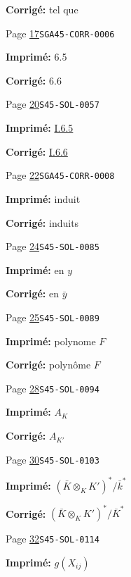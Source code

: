 \documentclass[oneside]{book}
\theoremstyle{sga-source}
\theoremstyle{sga-source-dash}
\theoremstyle{sga-source-dotdash}
\theoremstyle{sga-source-number-note-dash}
\theoremstyle{sga-source-note-number-dotdash}
\theoremstyle{sga-source-example-dotdash}
\theoremstyle{sga-source-inline-number}
\theoremstyle{sga-source-bare-number}
\theoremstyle{sga-source}
\begin{document}
\begin{description}
\par\noindent\textbf{Corrigé:} tel que
\smallskip
\item[\hypertarget{apparatus:FR-0009}{9}] Page \hyperlink{printpage:fr:17}{17}\quad\texttt{SGA45-CORR-0006}
\par\noindent\textbf{Imprimé:} 6.5
\par\noindent\textbf{Corrigé:} 6.6
\smallskip
\item[\hypertarget{apparatus:FR-0010}{10}] Page \hyperlink{printpage:fr:20}{20}\quad\texttt{S45-SOL-0057}
\par\noindent\textbf{Imprimé:} \hyperref[I:1-6-6]{I.6.5}
\par\noindent\textbf{Corrigé:} \hyperref[I:1-6-6]{I.6.6}
\smallskip
\item[\hypertarget{apparatus:FR-0011}{11}] Page \hyperlink{printpage:fr:22}{22}\quad\texttt{SGA45-CORR-0008}
\par\noindent\textbf{Imprimé:} induit
\par\noindent\textbf{Corrigé:} induits
\smallskip
\item[\hypertarget{apparatus:FR-0012}{12}] Page \hyperlink{printpage:fr:24}{24}\quad\texttt{S45-SOL-0085}
\par\noindent\textbf{Imprimé:} en $y$
\par\noindent\textbf{Corrigé:} en $\bar y$
\smallskip
\item[\hypertarget{apparatus:FR-0013}{13}] Page \hyperlink{printpage:fr:25}{25}\quad\texttt{S45-SOL-0089}
\par\noindent\textbf{Imprimé:} polynome $F$
\par\noindent\textbf{Corrigé:} polynôme $F$
\smallskip
\item[\hypertarget{apparatus:FR-0014}{14}] Page \hyperlink{printpage:fr:28}{28}\quad\texttt{S45-SOL-0094}
\par\noindent\textbf{Imprimé:} \(A_K\)
\par\noindent\textbf{Corrigé:} \(A_{K'}\)
\smallskip
\item[\hypertarget{apparatus:FR-0015}{15}] Page \hyperlink{printpage:fr:30}{30}\quad\texttt{S45-SOL-0103}
\par\noindent\textbf{Imprimé:} \((\bar K\otimes_K K')^*/\bar k^*\)
\par\noindent\textbf{Corrigé:} \((\bar K\otimes_K K')^*/\bar K^*\)
\smallskip
\item[\hypertarget{apparatus:FR-0016}{16}] Page \hyperlink{printpage:fr:32}{32}\quad\texttt{S45-SOL-0114}
\par\noindent\textbf{Imprimé:} \(g(X_{i j})\)

\end{description}
\end{document}
